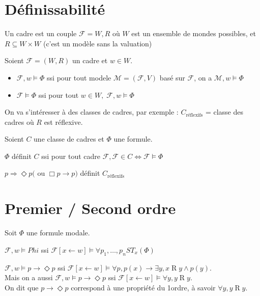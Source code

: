 \documentclass[10pt,a4paper]{article}
\newcommand{\F}{\mathcal{F}}
\newcommand{\M}{\mathcal{M}}
\DeclareMathOperator{\Ro}{R}
\begin{document}
\section{Définissabilité}

\begin{definition}[cadre]
 Un cadre est un couple $\F = W, R$ où $W$ est un ensemble de mondes possibles, et $R \subseteq W \times W$
(c'est un modèle sans la valuation)
\end{definition}

\begin{definition}
 Soient $\F = (W,R)$ un cadre et $w \in W$.
\begin{itemize}
 \item $\F, w \models \Phi$ ssi pour tout modele $\M = (\F, V)$ basé sur $\F$, on a $\M,w \models \Phi$
 \item $\F \models \Phi$ ssi pour tout $w \in W, \; \F, w \models \Phi$
\end{itemize}
\end{definition}
On va s'intéresser à des classes de cadres,  par exemple : 
$C_{\text{réflexifs}}$ = classe des cadres où $R$ est réflexive.

\begin{definition}
 Soient $C$ une classe de cadres et $\Phi$ une formule.

$\Phi$ définit $C$ ssi pour tout cadre $\F,\F \in C \Leftrightarrow \F \models \Phi$
\end{definition}

\begin{ex}
 $p \Rightarrow \Diamond p ($ ou $\Box p \rightarrow p)$ définit $C_{\text{réflexifs}}  $
\end{ex}


\section{Premier / Second ordre}

\begin{prop}
 Soit $\Phi$ une formule modale.

$\F,w \models Phi$ ssi $\F[x \leftarrow w] \models \forall p_1, \dots, p_n ST_x (\Phi)$
\end{prop}

\begin{ex}
 $\F,w \models p \rightarrow \Diamond p$ ssi $\F[x \leftarrow w] \models \forall p, p(x)  \rightarrow \exists y, x   \Ro y \wedge p(y)$.\\
Mais on a aussi $\F,w \models p  \rightarrow \Diamond p$ ssi $\F[x \leftarrow w] \models \forall y , y   \Ro y$.\\
On dit que $p \rightarrow \Diamond p$ correspond à une propriété du 1\ier ordre, à savoir $\forall y , y   \Ro y$.
\end{ex}
\end{document}
